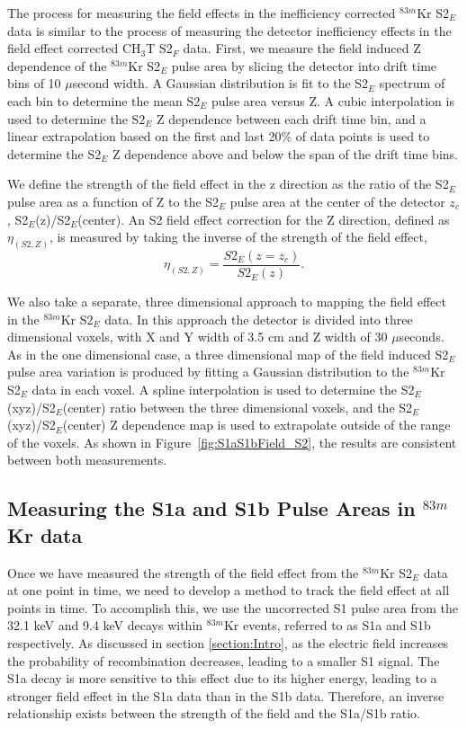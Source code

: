 The process for measuring the field effects in the inefficiency corrected $^{83m}$Kr S2$_E$ data is similar to the process of measuring the detector inefficiency effects in the field effect corrected CH$_3$T S2$_F$ data.  First, we measure the field induced Z dependence of the $^{83m}$Kr S2$_E$ pulse area by slicing the detector into drift time bins of 10 $\mu$second width.  A Gaussian distribution is fit to the S2$_E$ spectrum of each bin to determine the mean S2$_E$ pulse area versus Z.   A cubic interpolation is used to determine the S2$_E$ Z dependence between each drift time bin, and a linear extrapolation based on the first and last 20\% of data points is used to determine the S2$_E$ Z dependence above and below the span of the drift time bins.  

We define the strength of the field effect in the z direction as the ratio of the S2$_E$ pulse area as a function of Z to the S2$_E$ pulse area at the center of the detector $z_c$, S2$_E$(z)/S2$_E$(center).  An S2 field effect correction for the Z direction, defined as $\eta_{(S2,Z)}$, is measured by taking the inverse of the strength of the field effect, 
\begin{equation}
\eta_{(S2,Z)} = \frac{S2_E(z=z_c)}{S2_E(z)}.
\end{equation} 

We also take a separate, three dimensional approach to mapping the field effect in the $^{83m}$Kr S2$_E$ data. In this approach the detector is divided into three dimensional voxels, with X and Y width of 3.5 cm and Z width of 30 $\mu$seconds.  As in the one dimensional case, a three dimensional map of the field induced S2$_E$ pulse area variation is produced by fitting a Gaussian distribution to the $^{83m}$Kr S2$_E$ data in each voxel.  A spline interpolation is used to determine the S2$_E$(xyz)/S2$_E$(center) ratio between the three dimensional voxels, and the S2$_E$(xyz)/S2$_E$(center) Z dependence map is used to extrapolate outside of the range of the voxels.  As shown in Figure~\ref{fig:S1aS1bField_S2}, the results are consistent between both measurements.

\subsection{Measuring the S1a and S1b Pulse Areas in $^{83m}$Kr data} \label{section:S1aS1b1}

Once we have measured the strength of the field effect from the $^{83m}$Kr S2$_E$ data at one point in time, we need to develop a method to track the field effect at all points in time.  To accomplish this, we use the uncorrected S1 pulse area from the 32.1 keV and 9.4 keV decays within $^{83m}$Kr events, referred to as S1a and S1b respectively.  As discussed in section \ref{section:Intro}, as the electric field increases the probability of recombination decreases, leading to a smaller S1 signal.  The S1a decay is more sensitive to this effect due to its higher energy, leading to a stronger field effect in the S1a data than in the S1b data.   Therefore, an inverse relationship exists between the strength of the field and the S1a/S1b ratio.  

